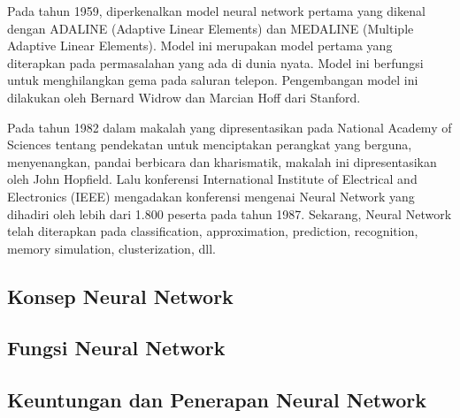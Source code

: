 Pada tahun 1959, diperkenalkan model neural network pertama yang dikenal dengan ADALINE (Adaptive Linear Elements) dan MEDALINE (Multiple Adaptive Linear Elements). Model ini merupakan model pertama yang diterapkan pada permasalahan yang ada di dunia nyata. Model ini berfungsi untuk menghilangkan gema pada saluran telepon. Pengembangan model ini dilakukan oleh Bernard Widrow dan Marcian Hoff dari Stanford.

Pada tahun 1982 dalam makalah yang dipresentasikan pada National Academy of Sciences tentang pendekatan untuk menciptakan perangkat yang berguna, menyenangkan, pandai berbicara dan kharismatik, makalah ini dipresentasikan oleh John Hopfield. Lalu konferensi International Institute of Electrical and Electronics (IEEE) mengadakan konferensi mengenai Neural Network yang dihadiri oleh lebih dari 1.800 peserta pada tahun 1987. Sekarang, Neural Network telah diterapkan pada classification, approximation, prediction, recognition, memory simulation, clusterization, dll. 

\subsection{Konsep Neural Network}

\subsection{Fungsi Neural Network}

\subsection{Keuntungan dan Penerapan Neural Network}